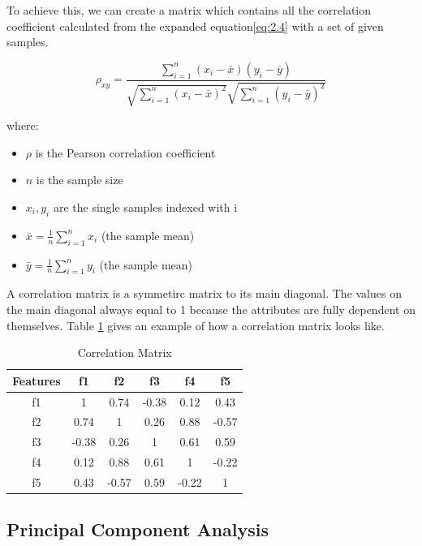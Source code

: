 \documentclass[11pt]{article} %
\theoremstyle{plain}
\theoremstyle{definition}
\begin{document}
To achieve this, we can create a matrix which contains all the correlation coefficient calculated from the expanded equation\eqref{eq:2.4} with a set of given samples.

{
  \begin{equation}
    \label{eq:2.4}
    \tag{2.4}
    {\rho_{xy}={\frac {\sum _{i=1}^{n}(x_{i}-{\bar {x}})(y_{i}-{\bar {y}})}{{\sqrt {\sum _{i=1}^{n}(x_{i}-{\bar {x}})^{2}}}{\sqrt {\sum _{i=1}^{n}(y_{i}-{\bar {y}})^{2}}}}}}
  \end{equation}

  \footnotesize
  where:
  \begin{itemize}[label=-, leftmargin=4em, itemsep=0.1em]
    \item ${\rho}$ is the Pearson correlation coefficient
    \item ${n}$ is the sample size
    \item $x_{i}, y_{i}$ are the single samples indexed with i
    \item ${\bar {x}}={\frac {1}{n}}\sum _{i=1}^{n}x_{i}$ (the sample mean)
    \item ${\bar {y}}={\frac {1}{n}}\sum _{i=1}^{n}y_{i}$ (the sample mean)
  \end{itemize}
}

A correlation matrix is a symmetirc matrix to its main diagonal. The values on the main diagonal always equal to 1 because the attributes are fully dependent on themselves. Table \ref{table:cormat} gives an example of how a correlation matrix looks like.

{
  \begin{table}[ht]
    \centering
    \begin{tabular}{|c|c c c c c|}
      \hline
      Features & f1 & f2 & f3 & f4 & f5 \\ [0.5ex]
      \hline
      f1 & 1 & 0.74 & -0.38 & 0.12 & 0.43 \\ 
      \hline
      f2 & 0.74 & 1 & 0.26 & 0.88 & -0.57 \\
      \hline
      f3 & -0.38 & 0.26 & 1 & 0.61 & 0.59 \\
      \hline
      f4 & 0.12 & 0.88 & 0.61 & 1 & -0.22 \\
      \hline
      f5 & 0.43 & -0.57 & 0.59 & -0.22 & 1 \\ 
      \hline
    \end{tabular}
    \caption{Correlation Matrix}
    \label{table:cormat}
  \end{table}
}

\subsection{Principal Component Analysis}
\end{document}
